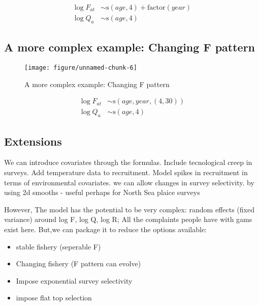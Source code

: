 \documentclass[a4paper]{article}\usepackage{graphicx, color}
\makeatletter
\def\maxwidth{ %
  \ifdim\Gin@nat@width>\linewidth
    \linewidth
  \else
    \Gin@nat@width
  \fi
}
\newenvironment{knitrout}{}{} %
\makeatother
\begin{document}
\begin{align*}
  \log F_{at} &\sim \text{s}(age, 4) + \text{factor}(year) \\
  \log Q_{a}  &\sim \text{s}(age, 4)
\end{align*}


\subsection*{A more complex example: Changing F pattern}



\begin{knitrout}
\color{fgcolor}\begin{figure}[H]


{\centering \texttt{[image: figure/unnamed-chunk-6]} 

}

\caption[A more complex example]{A more complex example: Changing F pattern\label{fig:unnamed-chunk-6}}
\end{figure}

\end{knitrout}

\begin{align*}
  \log F_{at} &\sim \text{s}(age, year, (4,30)) \\
  \log Q_{a}  &\sim \text{s}(age, 4)
\end{align*}


\subsection*{Extensions}

We can introduce covariates through the formulas. Include tecnological creep in surveys. Add temperature data to recruitment. Model spikes in recruitment in terms of environmental covariates. we can allow changes in survey selectivity. by using 2d smooths - useful perhaps for North Sea plaice surveys

However, The model has the potential to be very complex: random effects (fixed variance) around log F, log Q, log R; All the complaints people have with gams exist here.  But,we can package it to reduce the options available:
  \begin{itemize}
    \item stable fishery (seperable F)
    \item Changing fishery (F pattern can evolve)
    \item Impose exponential survey selectivity
    \item impose flat top selection
  \end{itemize}
\end{document}

